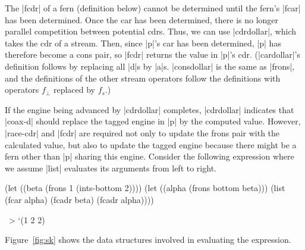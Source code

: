 \schemedisplayspace
{}


\wspace

The \scheme|fcdr| of a fern (definition below) cannot be determined until the
fern's \scheme|fcar| has been determined.  Once the car has been determined,
there is no longer parallel competition between potential cdrs.  Thus,
we can use \scheme|cdrdollar|, which takes the cdr of a stream. Then,
since \scheme|p|'s car has been determined, \scheme|p| has therefore
become a cons pair, so \scheme|fcdr| returns the value in \scheme|p|'s
cdr.  (\scheme|cardollar|'s definition follows by replacing all
\scheme|d|s by \scheme|a|s.  \scheme|consdollar| is the same as
\scheme|frons|, and the definitions of the other stream operators
follow the definitions with operators $f_{\perp}$ replaced by $f_s$.)

\schemedisplayspace
{}

\wspace

If the engine being advanced by \scheme|cdrdollar| completes,
\scheme|cdrdollar| indicates that \scheme|coax-d| should replace the
tagged engine in \scheme|p| by the computed value.  However,
\scheme|race-cdr| and \scheme|fcdr| are required not only to update
the frons pair with the calculated value, but also to update
the tagged engine because there might be a fern other than \scheme|p|
sharing this engine. Consider the following expression where we assume
\scheme|list| evaluates its arguments from left to right.

\schemedisplayspace
\begin{schemedisplay}
(let ((beta (frons 1 (ints-bottom 2))))
  (let ((alpha (frons bottom beta)))
    (list (fcar alpha) (fcadr beta) (fcadr alpha))))
\end{schemedisplay}
\nspace
\begin{schemeresponse}
~> `(1 2 2)
\end{schemeresponse}

\wspace

\noindent Figure~\ref{fig:sk} shows the data structures involved in
evaluating the expression. 

\schemedisplayspace

\vspace{-5pt}

